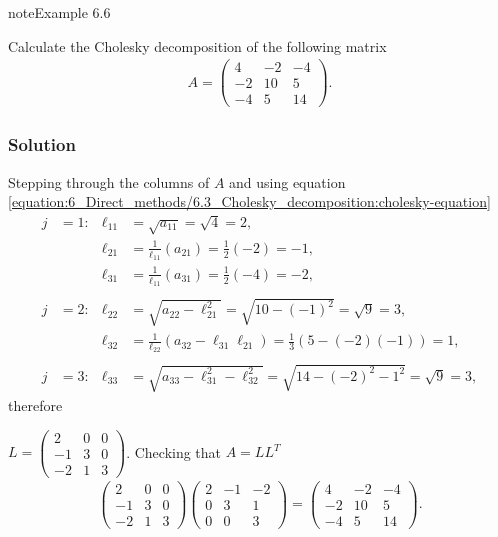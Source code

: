\documentclass[letterpaper,10pt,english]{jupyterBook}
\begin{document}
\begin{sphinxadmonition}{note}{Example 6.6}

\sphinxAtStartPar
Calculate the Cholesky decomposition of the following matrix
\begin{align*}
    A = \begin{pmatrix}
        4 & -2 & -4\\
        -2 & 10 & 5\\
        -4 & 5 & 14
    \end{pmatrix}.
\end{align*}\subsubsection*{Solution}

\sphinxAtStartPar
Stepping through the columns of \(A\) and using equation \eqref{equation:6_Direct_methods/6.3_Cholesky_decomposition:cholesky-equation}
\begin{align*}
    j &= 1: & \ell_{11} &= \sqrt{a_{11}} = \sqrt{4} = 2,\\
    && \ell_{21} &= \frac{1}{\ell_{11}}(a_{21}) = \frac{1}{2}(-2) = -1,\\
    && \ell_{31} &= \frac{1}{\ell_{11}}(a_{31}) = \frac{1}{2}(-4) = -2,\\
    \\
    j &= 2: & \ell_{22} &= \sqrt{a_{22} - \ell_{21}^2} = \sqrt{10 - (-1)^2} = \sqrt{9} = 3,\\
    && \ell_{32} &= \frac{1}{\ell_{22}}(a_{32} - \ell_{31} \ell_{21}) = \frac{1}{3}(5 - (-2)(-1)) = 1,\\
    \\
    j &= 3: & \ell_{33} &= \sqrt{a_{33} - \ell_{31}^2 - \ell_{32}^2} = \sqrt{14 - (-2)^2 - 1^2} = \sqrt{9} = 3,
\end{align*}
\sphinxAtStartPar
therefore

\sphinxAtStartPar
\(L=\begin{pmatrix} 2 & 0 & 0 \\ -1 & 3 & 0 \\ -2 & 1 & 3 \end{pmatrix}\). Checking that \(A = LL^T\)
\begin{align*}
    \begin{pmatrix}
        2 & 0 & 0\\
        -1 & 3 & 0\\
        -2 & 1 & 3
    \end{pmatrix}
    \begin{pmatrix}
        2 & -1 & -2\\
        0 & 3 & 1\\
        0 & 0 & 3
    \end{pmatrix} =
    \begin{pmatrix}
        4 & -2 & -4\\
        -2 & 10 & 5\\
        -4 & 5 & 14
    \end{pmatrix}.
\end{align*}\end{sphinxadmonition}
\end{document}

